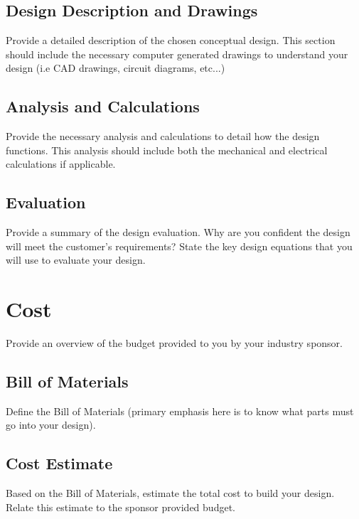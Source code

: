 \documentclass{other/docTemplate}
\begin{document}
\subsection{Design Description and Drawings}
Provide a detailed description of the chosen conceptual design. This section should include the necessary computer generated drawings to understand your design (i.e CAD drawings, circuit diagrams, etc...)

\subsection{Analysis and Calculations}
Provide the necessary analysis and calculations to detail how the design functions. This analysis should include both the mechanical and electrical calculations if applicable.

\subsection{Evaluation}
Provide a summary of the design evaluation. Why are you confident the design will meet the customer's requirements? State the key design equations that you will use to evaluate your design. 


\clearpage
\section{Cost}
Provide an overview of the budget provided to you by your industry sponsor. 


\subsection{Bill of Materials}
Define the Bill of Materials (primary emphasis here is to know what parts must go into your design).



\subsection{Cost Estimate}
Based on the Bill of Materials, estimate the total cost to build your design. Relate this estimate to the sponsor provided budget.


\clearpage
\end{document}
